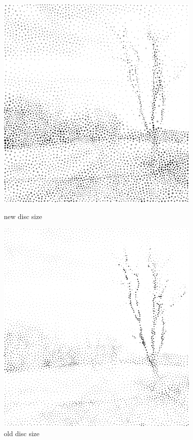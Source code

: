 \documentclass[11pt]{article}
\begin{document}
\begin{figure}[htbp]
\centering
\begin{minipage}[t]{0.48\textwidth}
\centering
\includegraphics[width = 0.9\textwidth]{new_nature-4000.png}
\caption{new disc size}
\end{minipage}
\begin{minipage}[t]{0.48\textwidth}
\centering
\includegraphics[width = 0.9\textwidth]{old_nature-4000.png}
\caption{old disc size}
\end{minipage}
\end{figure}
\end{document}
